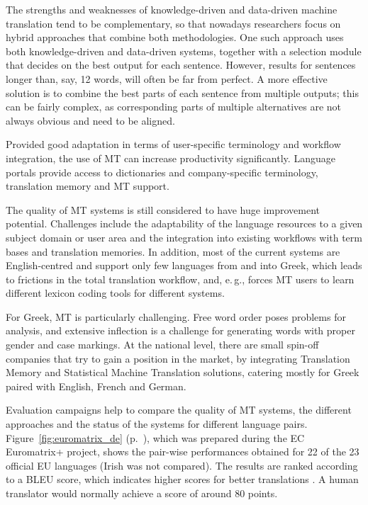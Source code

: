 \begin{multicols}{2}
The strengths and weaknesses of knowledge-driven and data-driven machine translation tend to be complementary, so that nowadays researchers focus on hybrid approaches that combine both methodologies. One such approach uses both knowledge-driven and data-driven systems, together with a selection module that decides on the best output for each sentence. However, results for sentences longer than, say, 12 words, will often be far from perfect. A more effective solution is to combine the best parts of each sentence from multiple outputs; this can be fairly complex, as corresponding parts of multiple alternatives are not always obvious and need to be aligned. 

Provided good adaptation in terms of user-specific terminology and workflow integration, the use of MT can increase productivity significantly. Language portals provide access to dictionaries and company-specific terminology, translation memory and MT support.


The quality of MT systems is still considered to have huge improvement potential. Challenges include the adaptability of the language resources to a given subject domain or user area and the integration into existing workflows with term bases and translation memories. In addition, most of the current systems are English-centred and support only few languages from and into Greek, which leads to frictions in the total translation workflow, and, e.\,g., forces MT users to learn different lexicon coding tools for different systems.

For Greek, MT is particularly challenging. Free word order poses problems for analysis, and extensive inflection is a challenge for generating words with proper gender and case markings. At the national level, there are small spin-off companies that try to gain a position in the market, by integrating Translation Memory and Statistical Machine Translation solutions, catering mostly for Greek paired with English, French and German.

Evaluation campaigns help to compare the quality of MT systems, the different approaches and the status of the systems for different language pairs. Figure~\ref{fig:euromatrix_de} (p.~\pageref{fig:euromatrix_de}), which was prepared during the EC Euromatrix+ project, shows the pair-wise performances obtained for 22 of the 23 official EU languages (Irish was not compared). The results are ranked according to a BLEU score, which indicates higher scores for better translations \cite{bleu1}. A human translator would normally achieve a score of around 80 points.


\end{multicols}
